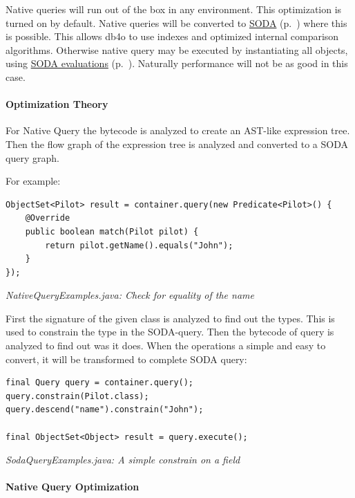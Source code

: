 Native queries will run out of the box in any environment. This optimization is turned on by default. Native queries will be converted to \hyperref[ref:basics-querying-soda-query]{SODA} (p.~\pageref{ref:basics-querying-soda-query}) where this is possible. This allows db4o to use indexes and optimized internal comparison algorithms. Otherwise native query may be executed by instantiating all objects, using \hyperref[ref:basics-querying-soda-soda-evaluations]{SODA evaluations} (p.~\pageref{ref:basics-querying-soda-soda-evaluations}). Naturally performance will not be as good in this case.

\paragraph*{Optimization Theory}

For Native Query the bytecode is analyzed to create an AST-like expression tree. Then the flow graph of the expression tree is analyzed and converted to a SODA query graph.

For example:

\begin{lstlisting}
ObjectSet<Pilot> result = container.query(new Predicate<Pilot>() {
    @Override
    public boolean match(Pilot pilot) {
        return pilot.getName().equals("John");
    }
});
\end{lstlisting}

{\small\itshape NativeQueryExamples.java: Check for equality of the name\par}
\medskip

First the signature of the given class is analyzed to find out the types. This is used to constrain the type in the SODA-query. Then the bytecode of query is analyzed to find out was it does. When the operations a simple and easy to convert, it will be transformed to complete SODA query:

\begin{lstlisting}
final Query query = container.query();
query.constrain(Pilot.class);
query.descend("name").constrain("John");

final ObjectSet<Object> result = query.execute();
\end{lstlisting}

{\small\itshape SodaQueryExamples.java: A simple constrain on a field\par}
\medskip

\paragraph*{Native Query Optimization}

